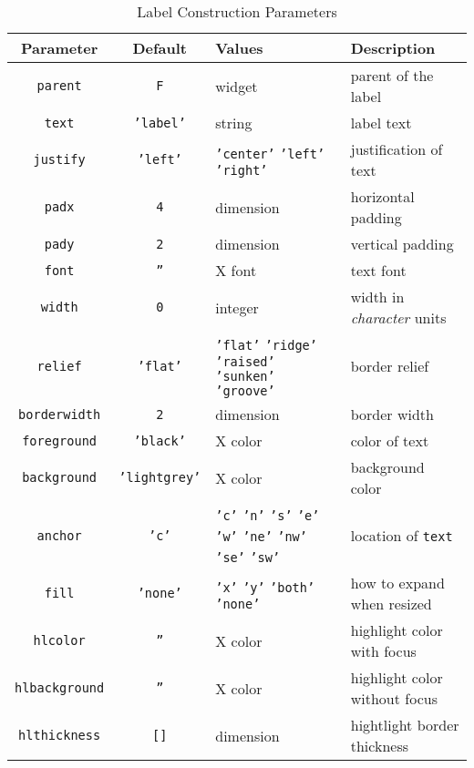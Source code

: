 \begin{table}[tbh]
{\small
\begin{center}
\begin{tabular}{|c|c|p{1.7in}|p{1.3in}|}
\hline
Parameter & Default & Values & Description \\
\hline
\hline
{\tt parent}		& {\tt F}	& widget & parent of the label \\ \hline
{\tt text}		& {\tt 'label'}	& string & label text \\ \hline
{\tt justify}		& {\tt 'left'}& {\tt 'center'} {\tt 'left'} {\tt 'right'} & justification of text \\ \hline
{\tt padx}		& {\tt 4}	& dimension & horizontal padding \\ \hline
{\tt pady}		& {\tt 2}	& dimension & vertical padding \\ \hline
{\tt font}		& {\tt ''}	& X font & text font \\ \hline
{\tt width}		& {\tt 0}	& integer & width in {\em character} units \\ \hline
{\tt relief}		& {\tt 'flat'}	& {\tt 'flat'} {\tt 'ridge'} {\tt 'raised'} {\tt 'sunken'} {\tt 'groove'} & border relief \\ \hline
{\tt borderwidth}	& {\tt 2}	& dimension & border width \\ \hline
{\tt foreground}	& {\tt 'black'}	& X color & color of text \\ \hline
{\tt background}	& {\tt 'lightgrey'}& X color & background color \\ \hline
{\tt anchor}            & {\tt 'c'}     & {\tt 'c'} {\tt 'n'} {\tt 's'} {\tt 'e'} {\tt 'w'} {\tt 'ne'} {\tt 'nw'} {\tt 'se'} {\tt 'sw'} & location of {\tt text} \\ \hline
{\tt fill}		& {\tt 'none'}	& {\tt 'x'} {\tt 'y'} {\tt 'both'} {\tt 'none'} & how to expand when resized \\ \hline
{\tt hlcolor}		& {\tt ''}	& X color & highlight color with focus \\ \hline
{\tt hlbackground}	& {\tt ''}	& X color & highlight color without focus \\ \hline
{\tt hlthickness}	& {\tt []}	& dimension & hightlight border thickness \\ \hline
\end{tabular}
\end{center}
}
\caption{ Label Construction Parameters }
\label{tklabel-params}
\end{table}

